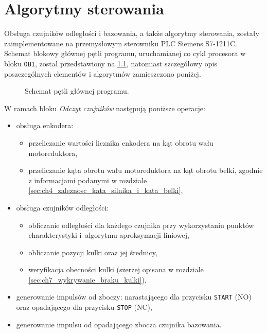 \chapter{Algorytmy sterowania}
\label{cha:ch7_algorytmy_sterowania}

Obsługa czujników odległości i bazowania, a także algorytmy sterowania, zostały zaimplementowane na przemysłowym sterowniku PLC Siemens S7-1211C. Schemat blokowy głównej pętli programu, uruchamianej co cykl procesora w bloku \texttt{OB1}, został przedstawiony na \cref{fig:schemat_petla_glowna_PLC}, natomiast szczegółowy opis poszczególnych elementów i algorytmów zamieszczono poniżej.

\begin{figure}[ht]
    \centering
    
    
    \caption{Schemat pętli głównej programu.}
    \label{fig:schemat_petla_glowna_PLC}
\end{figure}

W ramach bloku \textit{Odczyt czujników} następują poniższe operacje:
\begin{itemize}
    \item obsługa enkodera:
    \begin{itemize}
        \item przeliczanie wartości licznika enkodera na kąt obrotu wału motoreduktora,
        \item przeliczanie kąta obrotu wału motoreduktora na kąt obrotu belki, zgodnie z informacjami podanymi w rozdziale \ref{sec:ch4_zaleznosc_kata_silnika_i_kata_belki},
    \end{itemize}
    \item obsługa czujników odległości:
    \begin{itemize}
        \item obliczanie odległości dla każdego czujnika przy wykorzystaniu punktów charakterystyki i~algorytmu aproksymacji liniowej,
        \item obliczanie pozycji kulki oraz jej średnicy,
        \item weryfikacja obecności kulki (szerzej opisana w rozdziale \ref{sec:ch7_wykrywanie_braku_kulki}),
    \end{itemize}
    \item generowanie impulsów od zboczy: narastającego dla przycisku \texttt{START} (NO) oraz opadającego dla przycisku \texttt{STOP} (NC),
    \item generowanie impulsu od opadającego zbocza czujnika bazowania.
\end{itemize}

